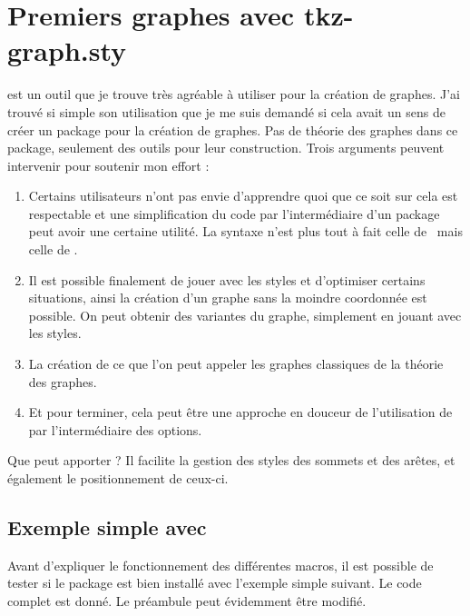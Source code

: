 
\section{Premiers graphes avec tkz-graph.sty}


  est un outil que je trouve très agréable à utiliser pour la création de graphes. J'ai trouvé si simple son utilisation que je me suis demandé si cela avait un sens de créer un package pour  la création de graphes. Pas de théorie des graphes dans ce package, seulement des outils pour leur construction.  Trois arguments peuvent intervenir pour soutenir mon effort :

\begin{enumerate}

\item Certains utilisateurs n'ont pas envie d'apprendre quoi que ce soit sur  \TIKZ\; cela est respectable et une simplification du code par l'intermédiaire d'un package peut avoir une certaine utilité. La syntaxe n'est plus tout à fait celle de  \TIKZ\ mais celle de \LATEX.
\item Il est possible finalement de jouer avec les styles et d'optimiser certains situations, ainsi la création d'un graphe sans la moindre coordonnée est possible. On peut obtenir des variantes du graphe, simplement en jouant avec les styles.
\item  La création de ce que l'on peut appeler les graphes classiques de la théorie des graphes.
\item  Et pour terminer, cela peut être une approche en douceur de l'utilisation de \TIKZ\, par l'intermédiaire des options.

\end{enumerate}

Que peut apporter  ? Il  facilite la gestion des styles des sommets  et des arêtes, et également le positionnement de ceux-ci.

\subsection{Exemple simple avec }
Avant d'expliquer le fonctionnement des différentes macros, il est possible de tester si le package est bien installé avec l'exemple simple suivant. Le code complet est donné. Le préambule peut évidemment être modifié.



